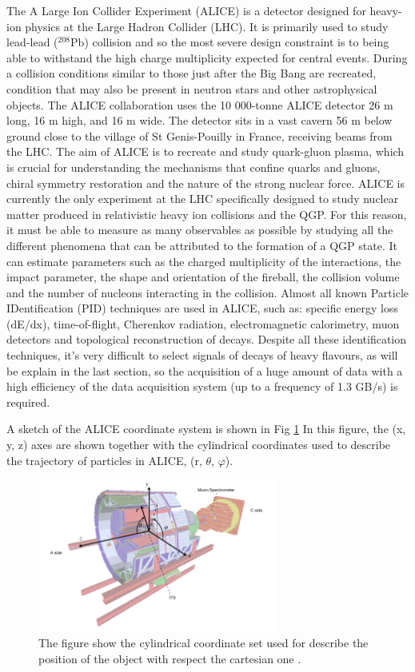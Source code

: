 \documentclass[12pt,a4paper]{book}
\begin{document}
	The A Large Ion Collider Experiment (ALICE) is a detector designed for heavy-ion physics at the Large Hadron Collider (LHC). It is primarily used to study lead-lead ($^{208}\text{Pb}$) collision and so the most severe design constraint is to being able to withstand the high charge multiplicity expected for central events. During a collision conditions similar to those just after the Big Bang are recreated, condition that may also be present in neutron stars and other astrophysical objects. The ALICE collaboration uses the 10 000-tonne ALICE detector 26 m long, 16 m high, and 16 m wide. The detector sits in a vast cavern 56 m below ground close to the village of St Genis-Pouilly in France, receiving beams from the LHC. \cite{Alice}  The aim of ALICE is to recreate and study quark-gluon plasma, which is crucial for understanding the mechanisms that confine quarks and gluons, chiral symmetry restoration and the nature of the strong nuclear force. ALICE is currently the only experiment at the LHC specifically designed to study nuclear matter produced in relativistic heavy ion collisions and the QGP. For this reason, it must be able to measure as many observables as possible by studying all the different phenomena that can be attributed to the formation of a QGP state. It can estimate parameters such as the charged multiplicity of the interactions, the impact parameter, the shape and orientation of the fireball, the collision volume and the number of nucleons interacting in the collision. Almost all known Particle IDentification (PID) techniques are used in ALICE, such as: specific energy loss (dE/dx), time-of-flight, Cherenkov radiation, electromagnetic calorimetry, muon detectors and topological reconstruction of decays. 
	Despite all these identification techniques, it's very difficult to select signals of decays of heavy flavours, as will be explain in the last section, so the acquisition of a huge amount of data with a high efficiency of the data acquisition system (up to a frequency of 1.3 GB/s) is required. 
	
	A sketch of the ALICE coordinate system is shown in Fig \ref{fig:ALICE_cordinates} In this figure, the (x, y, z) axes are shown together with the cylindrical coordinates used to describe the trajectory of particles in ALICE, (r, $\theta$, $\varphi$).
	\begin{figure}[h]
		\centering
		\includegraphics[width=0.7\textwidth]{pictures/ALICE_cordinates.png}
		\caption{The figure show the cylindrical coordinate set used for describe the position of the object with respect the cartesian one \cite{Herrmann:2920632}.}
		\label{fig:ALICE_cordinates}
	\end{figure}
	
\end{document}
